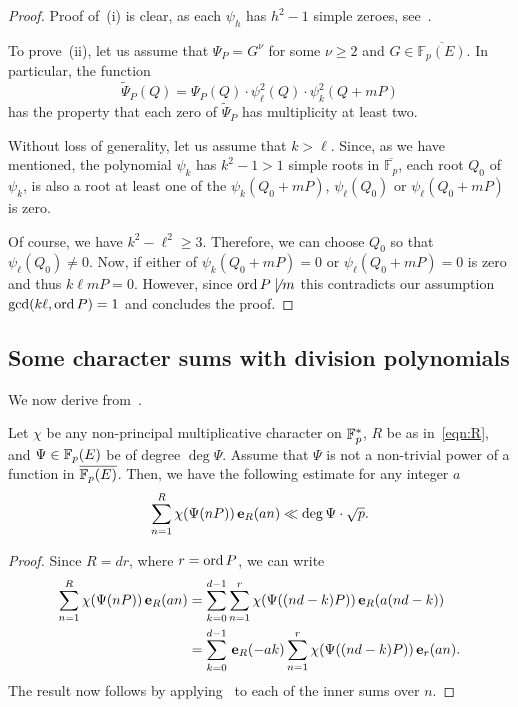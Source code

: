 \documentclass[12pt]{amsart}
\begin{document}
\begin{proof}
Proof of~(i) is clear, as each $\psi_h$ has $h^2-1$ simple zeroes,
see~\cite[Exercise~III.3.7]{Silv2}.  

To prove~(ii),  let us assume that $\Psi_P = G^\nu$ for some $\nu \geq 2$ and $G \in \overline{\mathbb{F}_p(E)}$. In particular, the function
\[
\widetilde{\Psi}_P(Q)=\Psi_P(Q) \cdot \psi^{2}_{\ell}(Q)\cdot \psi^{2}_{k}(Q+mP)
\]
has the property that each zero of $\widetilde{\Psi}_P$ has multiplicity at least two. 

Without loss of generality, let us assume that $k>\ell$. Since, as we have mentioned, the polynomial $\psi_{k}$ has $k^2-1>1$ simple roots in $\overline{\mathbb{F}_p}$, each root $Q_0$  of $\psi_{k}$, is also a root at least one of the $\psi_{k}(Q_0+mP)$, $\psi_{\ell}(Q_0)$ or $\psi_{\ell}(Q_0+mP)$ is zero.

Of course, we have $k^2-\ell^2\geq 3$. Therefore, we can choose $Q_0$ so that $\psi_{\ell}(Q_0) \neq 0$. Now, if either of $\psi_{k}(Q_0+mP)= 0$ or $\psi_{\ell}(Q_0+mP)= 0$ is zero and thus $k \ell m P = 0$.  However, since $\operatorname{ord} P\not\mid m$  this contradicts our assumption $\gcd(k\ell,\operatorname{ord} P)=1$  and 
concludes the proof. 
\end{proof}
\subsection{Some character sums with division polynomials} 

We now  derive from~\cite[Lemma~4.2]{ShSt}. 

\begin{lem}\label{lem:key}
Let $\chi$ be any non-principal multiplicative character on ${\mathbb F}_p^{*}$, $R$ be as in~\eqref{eqn:R}, and $\Psi\in {\mathbb F}_p(E)$ be of degree $\deg \Psi$. Assume that $\Psi$ is not a non-trivial power of a function in $\overline{{\mathbb F}_p(E)}$. Then, we have the following estimate for any integer $a$
$$\sum_{n=1}^R \chi(\Psi(nP)){\mathbf{\,e}}_R(an)\ll  \deg \Psi \cdot \sqrt{p}.$$
\end{lem} 

\begin{proof}
    Since $R=dr$, where $r=\operatorname{ord} P$, we can write
    \begin{align*}
    \sum_{n=1}^R \chi(\Psi(nP)){\mathbf{\,e}}_R(an) & =\sum_{k = 0}^{d-1} \sum_{n=1}^r \chi(\Psi((nd-k)P)){\mathbf{\,e}}_R(a(nd-k))\\
    &=\sum_{k = 0}^{d-1} {\mathbf{\,e}}_R(-ak) \sum_{n=1}^r \chi(\Psi((nd-k)P)){\mathbf{\,e}}_r(an).
    \end{align*}
    The result now follows by applying~\cite[Lemma~4.2]{ShSt} to each of the inner sums over $n$.  
\end{proof}
\end{document}
